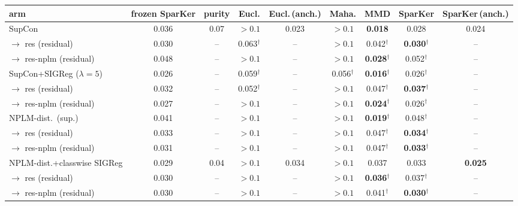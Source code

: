 \begin{table}[t]
\centering
\footnotesize
\begin{tabular}{lcccccccc}
\toprule
arm & frozen SparKer & purity & Eucl. & Eucl.\,(anch.) & Maha. & MMD & SparKer & SparKer\,(anch.) \\
\midrule
SupCon & 0.036 & 0.07 & $>0.1$ & 0.023 & $>0.1$ & \textbf{0.018} & 0.028 & 0.024 \\
\quad $\to$ res (residual) & 0.030 & -- & 0.063$^\dagger$ & -- & $>0.1$ & 0.042$^\dagger$ & \textbf{0.030$^\dagger$} & -- \\
\quad $\to$ res-nplm (residual) & 0.048 & -- & $>0.1$ & -- & $>0.1$ & \textbf{0.028$^\dagger$} & 0.052$^\dagger$ & -- \\
\addlinespace
SupCon+SIGReg ($\lambda{=}5$) & 0.026 & -- & 0.059$^\dagger$ & -- & 0.056$^\dagger$ & \textbf{0.016$^\dagger$} & 0.026$^\dagger$ & -- \\
\quad $\to$ res (residual) & 0.032 & -- & 0.052$^\dagger$ & -- & $>0.1$ & 0.047$^\dagger$ & \textbf{0.037$^\dagger$} & -- \\
\quad $\to$ res-nplm (residual) & 0.027 & -- & $>0.1$ & -- & $>0.1$ & \textbf{0.024$^\dagger$} & 0.026$^\dagger$ & -- \\
\addlinespace
NPLM-dist.\ (sup.) & 0.041 & -- & $>0.1$ & -- & $>0.1$ & \textbf{0.019$^\dagger$} & 0.048$^\dagger$ & -- \\
\quad $\to$ res (residual) & 0.033 & -- & $>0.1$ & -- & $>0.1$ & 0.047$^\dagger$ & \textbf{0.034$^\dagger$} & -- \\
\quad $\to$ res-nplm (residual) & 0.031 & -- & $>0.1$ & -- & $>0.1$ & 0.047$^\dagger$ & \textbf{0.033$^\dagger$} & -- \\
\addlinespace
NPLM-dist.+classwise SIGReg & 0.029 & 0.04 & $>0.1$ & 0.034 & $>0.1$ & 0.037 & 0.033 & \textbf{0.025} \\
\quad $\to$ res (residual) & 0.030 & -- & $>0.1$ & -- & $>0.1$ & \textbf{0.036$^\dagger$} & 0.037$^\dagger$ & -- \\
\quad $\to$ res-nplm (residual) & 0.030 & -- & $>0.1$ & -- & $>0.1$ & 0.041$^\dagger$ & \textbf{0.030$^\dagger$} & -- \\

\end{tabular}
\end{table}
